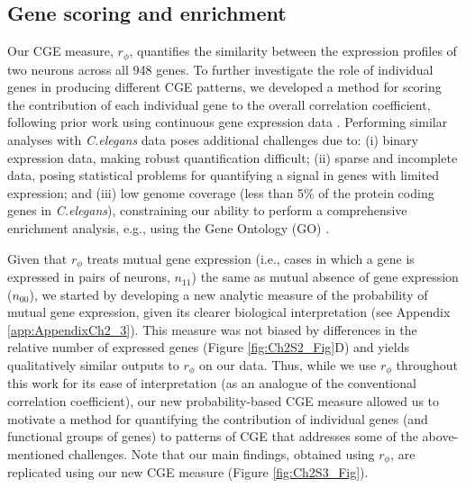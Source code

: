\subsection*{Gene scoring and enrichment}
Our CGE measure, $r_\phi$, quantifies the similarity between the expression profiles of two neurons across all 948 genes.
To further investigate the role of individual genes in producing different CGE patterns, we developed a method for scoring the contribution of each individual gene to the overall correlation coefficient, following prior work using continuous gene expression data \citep{Fulcher2016}.
Performing similar analyses with \emph{C.elegans} data poses additional challenges due to:
(i) binary expression data, making robust quantification difficult;
(ii) sparse and incomplete data, posing statistical problems for quantifying a signal in genes with limited expression;
and (iii) low genome coverage (less than 5\% of the protein coding genes in \emph{C.elegans}), constraining our ability to perform a comprehensive enrichment analysis, e.g., using the Gene Ontology (GO) \mbox{\citep{Ashburner2000}}.

Given that $r_\phi$ treats mutual gene expression (i.e., cases in which a gene is expressed in pairs of neurons, $n_{11}$) the same as mutual absence of gene expression ($n_{00}$), we started by developing a new analytic measure of the probability of mutual gene expression, given its clearer biological interpretation (see Appendix \ref{app:AppendixCh2_3}).
This measure was not biased by differences in the relative number of expressed genes (Figure \ref{fig:Ch2S2_Fig}D) and yields qualitatively similar outputs to $r_\phi$ on our data.
Thus, while we use $r_\phi$ throughout this work for its ease of interpretation (as an analogue of the conventional correlation coefficient), our new probability-based CGE measure allowed us to motivate a method for quantifying the contribution of individual genes (and functional groups of genes) to patterns of CGE that addresses some of the above-mentioned challenges.
Note that our main findings, obtained using $r_\phi$, are replicated using our new CGE measure (Figure \ref{fig:Ch2S3_Fig}).

